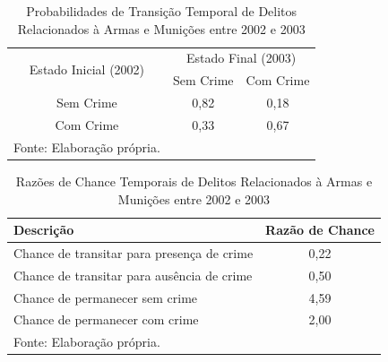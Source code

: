 \documentclass[12pt,openright,oneside,a4paper,english,french,spanish]{abntex2}
\numberwithin{table}{section} %
\numberwithin{figure}{section} %
\begin{document}
\begin{subappendices}
\begin{table}[H]
\centering
\caption{Probabilidades de Transição Temporal de Delitos Relacionados à Armas e Munições entre 2002 e 2003}
        \begin{tabular}{ccc}
            \hline
            \multirow{2}{*}{Estado Inicial (2002)} & \multicolumn{2}{c}{Estado Final (2003)}  \\\cline{2-3} 
                                     & \multicolumn{1}{l}{Sem Crime} & \multicolumn{1}{l}{Com Crime} \\\hline
            {Sem Crime} & {0,82} & {0,18} \\                \hline
            {Com Crime} & {0,33} & {0,67} \\                \hline
            \tiny Fonte: Elaboração própria.
        \end{tabular}
    \label{tab:prob_tempo_rel_arma_2002_2003}
\end{table}

\begin{table}[H]
\centering
\caption{Razões de Chance Temporais de Delitos Relacionados à Armas e Munições entre 2002 e 2003}
        \begin{tabular}{lc}
            \hline
            {\textbf{Descrição}} & {\textbf{Razão de Chance}} \\\hline
            {Chance de transitar para presença de crime} & {0,22} \\
            {Chance de transitar para ausência de crime} & {0,50} \\
            {Chance de permanecer sem crime} & {4,59} \\
            {Chance de permanecer com crime} & {2,00} \\\hline
            \tiny Fonte: Elaboração própria.
        \end{tabular}
    \label{tab:odds_tempo_rel_arma_2002_2003}
\end{table}



\end{subappendices}
\end{document}
